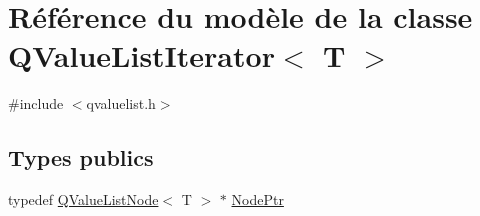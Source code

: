 \hypertarget{class_q_value_list_iterator}{}\section{Référence du modèle de la classe Q\+Value\+List\+Iterator$<$ T $>$}
\label{class_q_value_list_iterator}


{\ttfamily \#include $<$qvaluelist.\+h$>$}

\subsection*{Types publics}
\begin{DoxyCompactItemize}
\item 
typedef \hyperlink{class_q_value_list_node}{Q\+Value\+List\+Node}$<$ T $>$ $\ast$ \hyperlink{class_q_value_list_iterator_abf409d04d86ddd5977132fecb2e6db61}{Node\+Ptr}
\end{DoxyCompactItemize}

